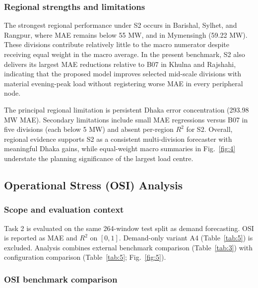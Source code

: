 \subsubsection{Regional strengths and limitations}\label{subsubsection:regional_strengths_and_limitations}

The strongest regional performance under S2 occurs in Barishal, Sylhet, and Rangpur, where MAE remains below 55 MW, and in Mymensingh (59.22 MW). These divisions contribute relatively little to the macro numerator despite receiving equal weight in the macro average. In the present benchmark, S2 also delivers its largest MAE reductions relative to B07 in Khulna and Rajshahi, indicating that the proposed model improves selected mid-scale divisions with material evening-peak load without registering worse MAE in every peripheral node.

The principal regional limitation is persistent Dhaka error concentration (293.98 MW MAE). Secondary limitations include small MAE regressions versus B07 in five divisions (each below 5 MW) and absent per-region $R^2$ for S2. Overall, regional evidence supports S2 as a consistent multi-division forecaster with meaningful Dhaka gains, while equal-weight macro summaries in Fig.~\ref{fig:4} understate the planning significance of the largest load centre.

\subsection{Operational Stress (OSI) Analysis}\label{subsection:operational_stress_osi_analysis}

\subsubsection{Scope and evaluation context}\label{subsubsection:scope_and_evaluation_context}

Task 2 is evaluated on the same 264-window test split as demand forecasting. OSI is reported as MAE and $R^2$ on \([0, 1]\). Demand-only variant A4 (Table~\ref{tab:5}) is excluded. Analysis combines external benchmark comparison (Table~\ref{tab:3}) with configuration comparison (Table~\ref{tab:5}; Fig.~\ref{fig:5}).

\subsubsection{OSI benchmark comparison}\label{subsubsection:osi_benchmark_comparison}

